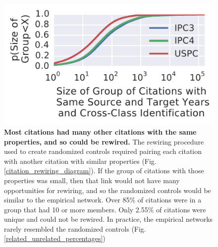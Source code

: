 \documentclass[pre,reprint,groupedaddress,superscriptaddress]{revtex4-1}
\begin{document}
\begin{figure}[h]
\centering
\includegraphics[]{figs/Citation_Group_Sizes.pdf} 

\caption{\textbf{Most citations had many other citations with the same properties, and so could be rewired.} The rewiring procedure used to create randomized controls required pairing each citation with another citation with similar properties (Fig. \ref{citation_rewiring_diagram}). If the group of citations with those properties was small, then that link would not have many opportunities for rewiring, and so the randomized controls would be similar to the empirical network. Over 85\% of citations were in a group that had 10 or more members. Only 2.55\% of citations were unique and could not be rewired. In practice, the empirical networks rarely resembled the randomized controls (Fig. \ref{related_unrelated_percentages})}\label{rewiring_groups}
\end{figure}
\end{document}

